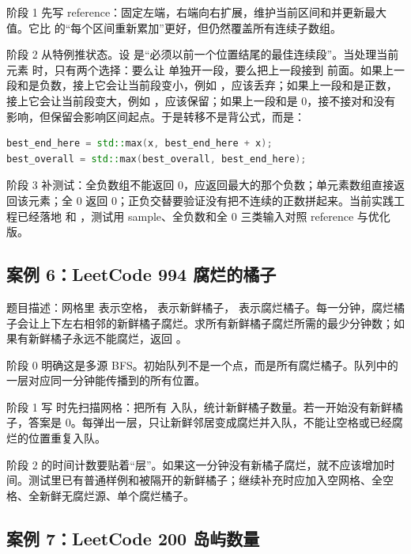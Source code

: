 阶段 1 先写  reference：固定左端，右端向右扩展，维护当前区间和并更新最大值。它比  的“每个区间重新累加”更好，但仍然覆盖所有连续子数组。

阶段 2 从特例推状态。设  是“必须以前一个位置结尾的最佳连续段”。当处理当前元素  时，只有两个选择：要么让  单独开一段，要么把上一段接到  前面。如果上一段和是负数，接上它会让当前段变小，例如 ，应该丢弃；如果上一段和是正数，接上它会让当前段变大，例如 ，应该保留；如果上一段和是 0，接不接对和没有影响，但保留会影响区间起点。于是转移不是背公式，而是：

\begin{lstlisting}[language=C++]
best_end_here = std::max(x, best_end_here + x);
best_overall = std::max(best_overall, best_end_here);
\end{lstlisting}

阶段 3 补测试：全负数组不能返回 0，应返回最大的那个负数；单元素数组直接返回该元素；全 0 返回 0；正负交替要验证没有把不连续的正数拼起来。当前实践工程已经落地  和 ，测试用 sample、全负数和全 0 三类输入对照 reference 与优化版。


\subsection{案例 6：LeetCode 994 腐烂的橘子}

题目描述：网格里  表示空格， 表示新鲜橘子， 表示腐烂橘子。每一分钟，腐烂橘子会让上下左右相邻的新鲜橘子腐烂。求所有新鲜橘子腐烂所需的最少分钟数；如果有新鲜橘子永远不能腐烂，返回 。

阶段 0 明确这是多源 BFS。初始队列不是一个点，而是所有腐烂橘子。队列中的一层对应同一分钟能传播到的所有位置。

阶段 1 写  时先扫描网格：把所有  入队，统计新鲜橘子数量。若一开始没有新鲜橘子，答案是 0。每弹出一层，只让新鲜邻居变成腐烂并入队，不能让空格或已经腐烂的位置重复入队。

阶段 2 的时间计数要贴着“层”。如果这一分钟没有新橘子腐烂，就不应该增加时间。测试里已有普通样例和被隔开的新鲜橘子；继续补充时应加入空网格、全空格、全新鲜无腐烂源、单个腐烂橘子。

\subsection{案例 7：LeetCode 200 岛屿数量}

